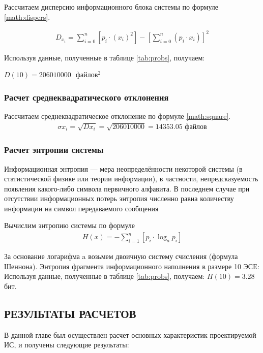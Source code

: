 \documentclass[a4paper,14pt]{extarticle}
\begin{document}
Рассчитаем дисперсию информационного блока системы по формуле \ref{math:dispers}.

\begin{align}
D_{x_i}=\sum_{i=0}^{n}\left[p_i \cdot \left(x_i\right)^2 \right] - \left[\sum_{i=0}^{n} \left(p_i \cdot x_i\right) \right]^2
\label{math:dispers}
\end{align}

Используя данные, полученные в таблице \ref{tab:probs}, получаем:

$D(10) = 206010000\mbox{ }файлов^2$

\subsubsection{Расчет среднеквадратического отклонения}

Рассчитаем среднеквадратическое отклонение по формуле \ref{math:square}.
\begin{align}
\sigma x_i= \sqrt{Dx_i} = \sqrt{206010000} = 14353.05\mbox{ файлов}	
\label{math:square}
\end{align}

\subsubsection{Расчет энтропии системы}

Информационная энтропия --- мера неопределённости некоторой системы (в статистической физике или теории информации), в частности, непредсказуемость появления какого-либо символа первичного алфавита. В последнем случае при отсутствии информационных потерь энтропия численно равна количеству информации на символ передаваемого сообщения

Вычислим энтропию системы по формуле 
\begin{align}
H(x) = - \sum_{i=1}^{n}\left[p_i \cdot \log_ap_i\right]
\end{align}

За основание логарифма a возьмем двоичную систему счисления (формула Шеннона). Энтропия фрагмента информационного наполнения в размере 10 ЭСЕ:
Используя данные, полученные в таблице \ref{tab:probs}, получаем:
$H(10) = 3.28 $ бит.

\subsection{РЕЗУЛЬТАТЫ РАСЧЕТОВ}

В данной главе был осуществлен расчет основных характеристик
проектируемой ИС, и получены следующие результаты:
\end{document}
